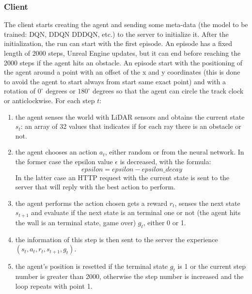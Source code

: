 \documentclass[14pt]{extarticle}
\def\sp{\vspace{5pt}}
\begin{document}
\begin{flushleft}
\subsubsection{Client}
\sp
The client starts creating the agent and sending some meta-data (the model to be trained: DQN, DDQN DDDQN, etc.) to the server to initialize it. After the initialization, the run can start with the first episode. An episode has a fixed length of 2000 steps, Unreal Engine updates, but it can end before reaching the 2000 steps if the agent hits an obstacle. An episode start with the positioning of the agent around a point with an offset of the x and y coordinates (this is done to avoid the agent to start always from start same exact point) and with a rotation of $0^{\circ}$ degrees or $180^{\circ}$ degrees so that the agent can circle the track clock or anticlockwise. For each step $t$:
\begin{enumerate}
\item the agent senses the world with LiDAR sensors and obtains the current state $s_t$: an array of 32 values that indicates if for each ray there is an obstacle or not. \label{point1}
\item the agent chooses an action $a_t$, either random or from the neural network. In the former case the epsilon value $\epsilon$ is decreased, with the formula:
\[epsilon = epsilon - epsilon\_decay\]
In the latter case an HTTP request with the current state is sent to the server that will reply with the best action to perform.
\item the agent performs the action chosen gets a reward $r_t$, senses the next state $s_{t+1}$ and evaluate if the next state is an terminal one or not (the agent hits the wall is an terminal state, game over) $g_t$, either 0 or 1.
\item the information of this step is then sent to the server the experience $(s_t,a_t,r_t,s_{t+1},g_t)$.
\item the agent's position is resetted if the terminal state $g_t$ is 1 or the current step number is greater than 2000, otherwise the step number is increased and the loop repeats with point 1.
\end{enumerate}


\end{flushleft}
\end{document}
